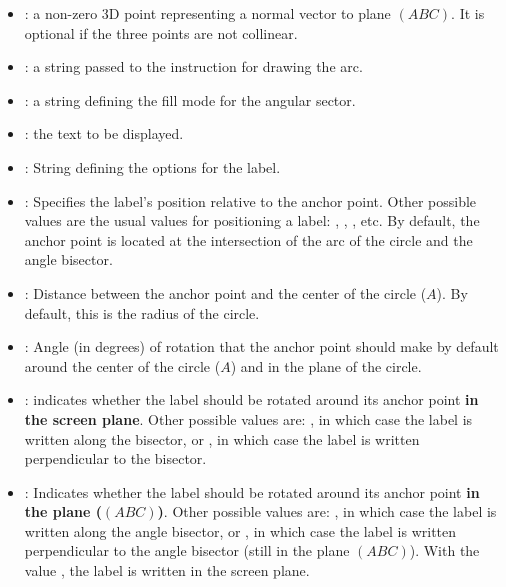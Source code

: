 \begin{itemize}
    \item {}: a non-zero 3D point representing a normal vector to plane $(ABC)$. It is optional if the three points are not collinear.

    \item {}: a string passed to the \drawcmd instruction for drawing the arc.

    \item {}: a string defining the fill mode for the angular sector.

    \item {}: the text to be displayed.

    \item {}: String defining the options for the label.

    \item {}: Specifies the label's position relative to the anchor point. Other possible values ​​are the usual values ​​for positioning a label: , , , etc. By default, the anchor point is located at the intersection of the arc of the circle and the angle bisector.

    \item {}: Distance between the anchor point and the center of the circle ($A$). By default, this is the radius  of the circle.

    \item {}: Angle (in degrees) of rotation that the anchor point should make by default around the center of the circle ($A$) and in the plane of the circle.

    \item {}: indicates whether the label should be rotated around its anchor point \textbf{in the screen plane}. Other possible values ​​are: , in which case the label is written along the bisector, or , in which case the label is written perpendicular to the bisector.

    \item {}: Indicates whether the label should be rotated around its anchor point \textbf{in the plane ($(ABC)$)}. Other possible values ​​are: , in which case the label is written along the angle bisector, or , in which case the label is written perpendicular to the angle bisector (still in the plane $(ABC)$). With the value , the label is written in the screen plane.


\end{itemize}
